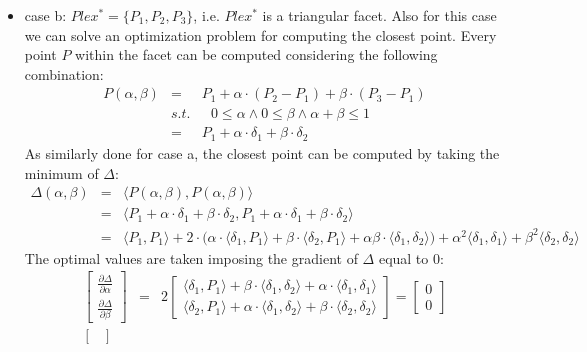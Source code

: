 \documentclass{article}
\begin{document}
\begin{itemize}
\item case b: $Plex^* = \lbrace P_1 , P_2, P_3 \rbrace$, i.e. $Plex^*$ is a triangular facet.
Also for this case we can solve an optimization problem for computing the closest point. Every point $P$ within the facet 
can be computed considering the following combination:
\begin{eqnarray}
P(\alpha , \beta) &=& P_1 + \alpha \cdot (P_2 - P_1) + \beta \cdot (P_3 - P_1) \nonumber\\
&s.t.& \,\,\,\, 0 \leq \alpha \wedge 0 \leq \beta  \wedge \alpha + \beta \leq 1 \nonumber\\
     &=& P_1 + \alpha \cdot \delta_1 + \beta \cdot \delta_2
\end{eqnarray}
As similarly done for case a, the closest point can be computed by taking the minimum of $\Delta$:
\begin{eqnarray}
\Delta(\alpha , \beta) &=& \langle P(\alpha , \beta), P(\alpha , \beta) \rangle \nonumber\\
&=& \langle P_1 + \alpha \cdot \delta_1 + \beta \cdot \delta_2, P_1 + \alpha \cdot \delta_1 + \beta \cdot \delta_2 \rangle \nonumber\\
&=& \langle P_1, P_1 \rangle + 2 \cdot \big( \alpha \cdot \langle \delta_1, P_1 \rangle + \beta \cdot \langle \delta_2, P_1 \rangle + \alpha \beta \cdot \langle \delta_1, \delta_2 \rangle \big) +
\alpha ^ 2 \langle \delta_1, \delta_1 \rangle + \beta ^ 2 \langle \delta_2, \delta_2 \rangle
\end{eqnarray}
The optimal values are taken imposing the gradient of $\Delta$ equal to 0:
\begin{eqnarray}
\begin{bmatrix} \frac{\partial \Delta}{\partial \alpha} \\ \frac{\partial \Delta}{\partial \beta} \end{bmatrix} &=&
2 \begin{bmatrix} 
\langle \delta_1, P_1\rangle + \beta \cdot \langle \delta_1, \delta_2\rangle + \alpha \cdot \langle \delta_1, \delta_1 \rangle \\ 
\langle \delta_2, P_1\rangle + \alpha \cdot \langle \delta_1, \delta_2\rangle + \beta \cdot \langle \delta_2, \delta_2 \rangle
\end{bmatrix} = \begin{bmatrix} 0 \\  0 \end{bmatrix} \nonumber\\
\begin{bmatrix}

\end{bmatrix}
\end{eqnarray}
\end{itemize}
\end{document}
